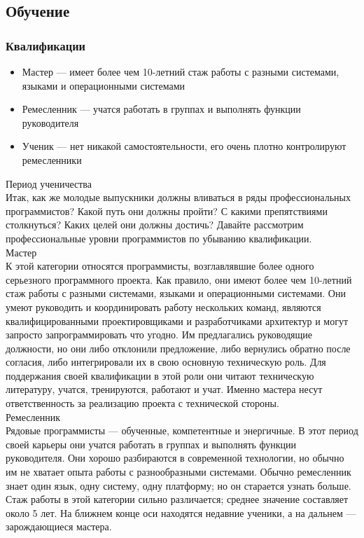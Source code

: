 \documentclass{../industrial-development}
\begin{document}
\subsection{Обучение}
\begin{frame} \frametitle{Квалификации}
\begin{itemize}
  \item Мастер --- имеет более чем 10-летний стаж работы с разными системами, языками и операционными системами
  \item Ремесленник --- учатся работать в группах и выполнять функции руководителя
	\item Ученик --- нет никакой самостоятельности, его очень плотно контролируют ремесленники
\end{itemize}
\end{frame}
\lecturenotes
Период ученичества\\
Итак, как же молодые выпускники должны вливаться в ряды профессиональных программистов? Какой путь они должны пройти? С какими препятствиями столкнуться? Каких целей они должны достичь? Давайте рассмотрим профессиональные уровни программистов по убыванию квалификации.\\
Мастер\\
К этой категории относятся программисты, возглавлявшие более одного серьезного программного проекта. Как правило, они имеют более чем 10-летний стаж работы с разными системами, языками и операционными системами. Они умеют руководить и координировать работу нескольких команд, являются квалифицированными проектировщиками и разработчиками архитектур и могут запросто запрограммировать что угодно. Им предлагались руководящие должности, но они либо отклонили предложение, либо вернулись обратно после согласия, либо интегрировали их в свою основную техническую роль. Для поддержания своей квалификации в этой роли они читают техническую литературу, учатся, тренируются, работают и учат. Именно мастера несут ответственность за реализацию проекта с технической стороны.\\
Ремесленник\\
Рядовые программисты — обученные, компетентные и энергичные. В этот период своей карьеры они учатся работать в группах и выполнять функции руководителя. Они хорошо разбираются в современной технологии, но обычно им не хватает опыта работы с разнообразными системами. Обычно ремесленник знает один язык, одну систему, одну платформу; но он старается узнать больше. Стаж работы в этой категории сильно различается; среднее значение составляет около 5 лет. На ближнем конце оси находятся недавние ученики, а на дальнем — зарождающиеся мастера.\\
\end{document}
